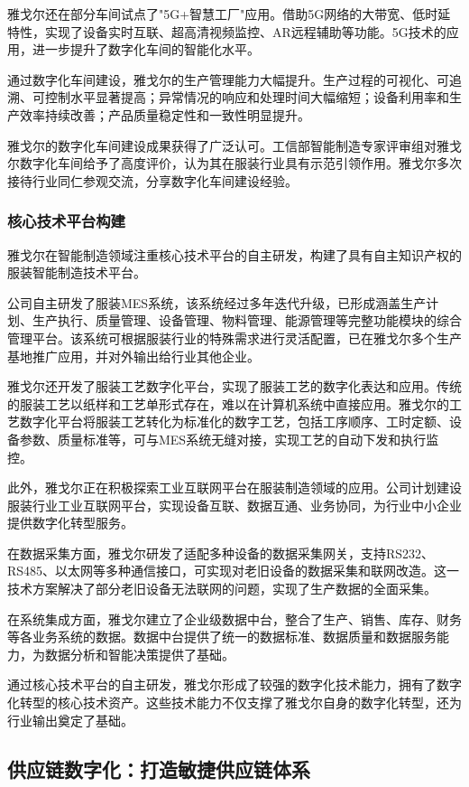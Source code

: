 \documentclass[12pt,a4paper]{article}
\begin{document}
雅戈尔还在部分车间试点了"5G+智慧工厂"应用。借助5G网络的大带宽、低时延特性，实现了设备实时互联、超高清视频监控、AR远程辅助等功能。5G技术的应用，进一步提升了数字化车间的智能化水平。

通过数字化车间建设，雅戈尔的生产管理能力大幅提升。生产过程的可视化、可追溯、可控制水平显著提高；异常情况的响应和处理时间大幅缩短；设备利用率和生产效率持续改善；产品质量稳定性和一致性明显提升。

雅戈尔的数字化车间建设成果获得了广泛认可。工信部智能制造专家评审组对雅戈尔数字化车间给予了高度评价，认为其在服装行业具有示范引领作用。雅戈尔多次接待行业同仁参观交流，分享数字化车间建设经验。

\subsubsection{核心技术平台构建}

雅戈尔在智能制造领域注重核心技术平台的自主研发，构建了具有自主知识产权的服装智能制造技术平台。

公司自主研发了服装MES系统，该系统经过多年迭代升级，已形成涵盖生产计划、生产执行、质量管理、设备管理、物料管理、能源管理等完整功能模块的综合管理平台。该系统可根据服装行业的特殊需求进行灵活配置，已在雅戈尔多个生产基地推广应用，并对外输出给行业其他企业。

雅戈尔还开发了服装工艺数字化平台，实现了服装工艺的数字化表达和应用。传统的服装工艺以纸样和工艺单形式存在，难以在计算机系统中直接应用。雅戈尔的工艺数字化平台将服装工艺转化为标准化的数字工艺，包括工序顺序、工时定额、设备参数、质量标准等，可与MES系统无缝对接，实现工艺的自动下发和执行监控。

此外，雅戈尔正在积极探索工业互联网平台在服装制造领域的应用。公司计划建设服装行业工业互联网平台，实现设备互联、数据互通、业务协同，为行业中小企业提供数字化转型服务。

在数据采集方面，雅戈尔研发了适配多种设备的数据采集网关，支持RS232、RS485、以太网等多种通信接口，可实现对老旧设备的数据采集和联网改造。这一技术方案解决了部分老旧设备无法联网的问题，实现了生产数据的全面采集。

在系统集成方面，雅戈尔建立了企业级数据中台，整合了生产、销售、库存、财务等各业务系统的数据。数据中台提供了统一的数据标准、数据质量和数据服务能力，为数据分析和智能决策提供了基础。

通过核心技术平台的自主研发，雅戈尔形成了较强的数字化技术能力，拥有了数字化转型的核心技术资产。这些技术能力不仅支撑了雅戈尔自身的数字化转型，还为行业输出奠定了基础。

\subsection{供应链数字化：打造敏捷供应链体系}
\end{document}
